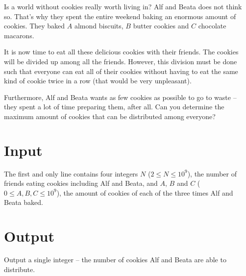 Is a world without cookies really worth living in?
Alf and Beata does not think so.
That's why they spent the entire weekend baking an enormous amount of cookies.
They baked $A$ almond biscuits, $B$ butter cookies and $C$ chocolate macarons.

It is now time to eat all these delicious cookies with their friends.
The cookies will be divided up among all the friends.
However, this division must be done such that everyone can eat all of their cookies without having to eat the same kind of cookie twice in a row (that would be very unpleasant).

Furthermore, Alf and Beata wants as few cookies as possible to go to waste -- they spent a lot of time preparing them, after all.
Can you determine the maximum amount of cookies that can be distributed among everyone?

\section*{Input}
The first and only line contains four integers $N$ ($2 \le N \le 10^9$), the number of friends eating cookies including Alf and Beata, and $A$, $B$ and $C$ ($0 \le A, B, C \le 10^9$), the amount of cookies of each of the three times Alf and Beata baked.

\section*{Output}
Output a single integer -- the number of cookies Alf and Beata are able to distribute.
